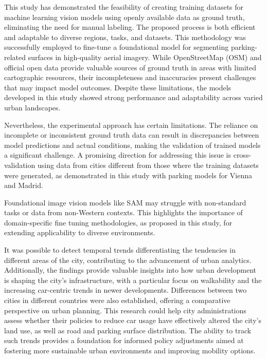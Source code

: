 \begin{refsection}
This study has demonstrated the feasibility of creating training datasets for machine learning vision models using openly available data as ground truth, eliminating the need for manual labeling. The proposed process is both efficient and adaptable to diverse regions, tasks, and datasets. This methodology was successfully employed to fine-tune a foundational model for segmenting parking-related surfaces in high-quality aerial imagery. While OpenStreetMap (OSM) and official open data provide valuable sources of ground truth in areas with limited cartographic resources, their incompleteness and inaccuracies present challenges that may impact model outcomes. Despite these limitations, the models developed in this study showed strong performance and adaptability across varied urban landscapes.


Nevertheless, the experimental approach has certain limitations. The reliance on incomplete or inconsistent ground truth data can result in discrepancies between model predictions and actual conditions, making the validation of trained models a significant challenge. A promising direction for addressing this issue is cross-validation using data from cities different from those where the training datasets were generated, as demonstrated in this study with parking models for Vienna and Madrid.


Foundational image vision models like SAM may struggle with non-standard tasks or data from non-Western contexts. This highlights the importance of domain-specific fine tuning methodologies, as proposed in this study, for extending applicability to diverse environments.


It was possible to detect temporal trends differentiating the tendencies in different areas of the city, contributing to the advancement of urban analytics. Additionally, the findings provide valuable insights into how urban development is shaping the city's infrastructure, with a particular focus on walkability and the increasing car-centric trends in newer developments. Differences between two cities in different countries were also established, offering a comparative perspective on urban planning. This research could help city administrations assess whether their policies to reduce car usage have effectively altered the city's land use, as well as road and parking surface distribution. The ability to track such trends provides a foundation for informed policy adjustments aimed at fostering more sustainable urban environments and improving mobility options.


\end{refsection}

